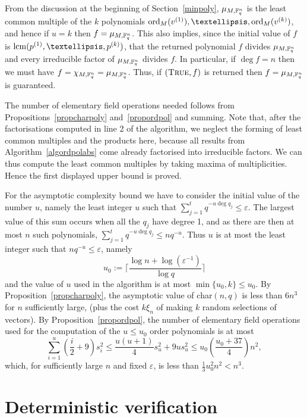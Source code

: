   From the discussion at the beginning of Section~\ref{minpoly},
$\mu_{M,\mathbb{F}_q^n}$ is the least common multiple of the $k$ polynomials
$\ord_M(v^{(1)}), \dots,\ord_M(v^{(k)})$, and hence if $u=k$ then
$f = \mu_{M,\mathbb{F}_q^n}$. This also implies, since the initial value
of $f$ is $\lcm(p^{(1)}, \ldots, p^{(k)})$, that the returned
polynomial $f$ divides $\mu_{M,\mathbb{F}_q^n}$ and every irreducible factor of
$\mu_{M,\mathbb{F}_q^n}$ divides $f$. In particular, if $\deg f =n$ then we must
have $f=\chi_{M,\mathbb{F}_q^n}=\mu_{M,\mathbb{F}_q^n}$. Thus, if $(\mbox{\sc True},f)$
is returned then $f = \mu_{M,\mathbb{F}_q^n}$ is guaranteed.


The number of elementary field operations needed follows from 
Propositions~\ref{propcharpoly} and~\ref{propordpol} and summing. Note that,
after the factorisations computed in line 2 of the algorithm, we neglect
the forming of least common multiples and the products here, because
all results from Algorithm~\ref{algordpolabs} come already factorised
into irreducible factors. We can thus compute the least common multiples
by taking maxima of multiplicities. Hence the first displayed upper
bound is proved.

For the asymptotic complexity bound we have to consider the initial value of the number $u$,
namely the least integer $u$ such that $\sum_{j=1}^t q^{-u \deg q_j} \le \varepsilon$.
The largest value of this sum occurs when all the $q_j$ have degree 1, and as there are 
then at most $n$ such polynomials,  $\sum_{j=1}^t q^{-u \deg q_j}\le nq^{-u}$. 
Thus $u$ is at most the least integer such that $nq^{-u}\le \varepsilon$, namely 
\[
u_0:=\lceil \frac{\log n + \log (\varepsilon^{-1})}{\log q}\rceil
\]
and the value of $u$ used in the algorithm is at most $\min\{u_0,k\}\leq u_0$.
By Proposition~\ref{propcharpoly}, the asymptotic value of char$(n,q)$ is
less than $6n^3$ for $n$ sufficiently large, (plus the cost $k\xi_n$ 
of making $k$ random selections of vectors). 
By Proposition~\ref{propordpol},  the number of elementary
field operations used for the computation of the  $u\le u_0$ order polynomials
is at most
\[
\sum_{i=1}^u(\frac{i}{2}+9)s_i^2 \leq \frac{u(u+1)}{4}s_u^2+9us_u^2
\le u_0\left(\frac{u_0+37}{4}\right) n^2,
\]
which, for sufficiently large $n$ and fixed $\varepsilon$, is less than
$\frac{1}{3}u_0^2n^2<n^3$.
\proofend

\section{Deterministic verification}
\label{verify}
%

